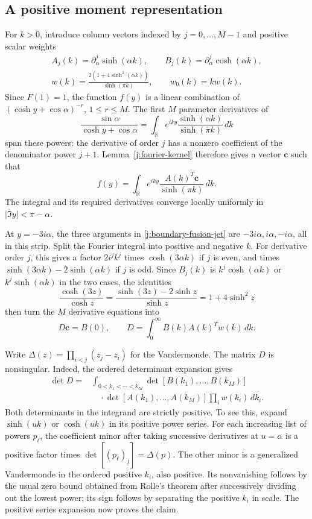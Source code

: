 \subsection{A positive moment representation}

For $k>0$, introduce column vectors indexed by $j=0,\ldots,M-1$ and
positive scalar weights
\[
 \begin{gathered}
 A_j(k)=\partial_\alpha^j\sinh(\alpha k),\qquad
 B_j(k)=\partial_\alpha^j\cosh(\alpha k),\\
 w(k)=\frac{2(1+4\sinh^2(\alpha k))}{\sinh(\pi k)},\qquad
 w_0(k)=k w(k).
 \end{gathered}
\]
Since $F(1)=1$, the function $f(y)$ is a linear combination of
$(\cosh y+\cos\alpha)^{-r}$, $1\le r\le M$. The first $M$ parameter
derivatives of
\[
 \frac{\sin\alpha}{\cosh y+\cos\alpha}
 =\int_{\mathbb R}e^{iky}\frac{\sinh(\alpha k)}{\sinh(\pi k)}\,dk
\]
span these powers: the derivative of order $j$ has a nonzero coefficient
of the denominator power $j+1$. Lemma~\ref{j:fourier-kernel} therefore
gives a vector $\mathbf c$ such that
\[
 f(y)=\int_{\mathbb R}e^{iky}
       \frac{A(k)^T\mathbf c}{\sinh(\pi k)}\,dk.
\]
The integral and its required derivatives converge locally uniformly in
$|\Im y|<\pi-\alpha$.

At $y=-3i\alpha$, the three arguments in
\eqref{j:boundary-fusion-jet} are $-3i\alpha,i\alpha,-i\alpha$, all in
this strip. Split the Fourier integral into positive and negative $k$.
For derivative order $j$, this gives a factor $2i^jk^j$ times
$\cosh(3\alpha k)$ if $j$ is even, and times
$\sinh(3\alpha k)-2\sinh(\alpha k)$ if $j$ is odd. Since $B_j(k)$ is
$k^j\cosh(\alpha k)$ or $k^j\sinh(\alpha k)$ in the two cases, the identities
\[
 \frac{\cosh(3z)}{\cosh z}
 =\frac{\sinh(3z)-2\sinh z}{\sinh z}
 =1+4\sinh^2z
\]
then turn the $M$ derivative equations into
\begin{equation}\label{j:boundary-moment}
 D\mathbf c=B(0),\qquad
 D=\int_0^\infty B(k)A(k)^T w(k)\,dk.
\end{equation}

Write $\Delta(z)=\prod_{i<j}(z_j-z_i)$ for the Vandermonde. The matrix
$D$ is nonsingular. Indeed, the ordered determinant expansion
gives
\[
 \begin{aligned}
 \det D={}&\int_{0<k_1<\cdots<k_M}
 \det[B(k_1),\ldots,B(k_M)]\\
 &\quad\cdot\det[A(k_1),\ldots,A(k_M)]
 \prod_iw(k_i)\,dk_i.
 \end{aligned}
\]
Both determinants in the integrand are strictly positive. To see this,
expand $\sinh(uk)$ or $\cosh(uk)$ in its positive power series. For each
increasing list of powers $p_\ell$, the coefficient minor after taking
successive derivatives at $u=\alpha$ is a positive factor times
\(\det[(p_\ell)_{\underline j}]=\Delta(p)\). The other minor is a
generalized Vandermonde in the ordered positive $k_i$, also positive.
Its nonvanishing follows by the usual zero bound obtained from Rolle's
theorem after successively dividing out the lowest power; its sign follows
by separating the positive $k_i$ in scale. The positive series expansion
now proves the claim.

